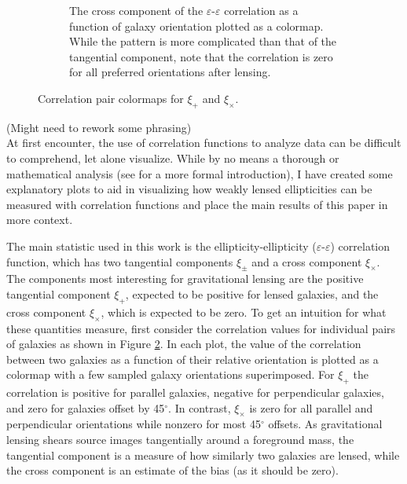\documentclass[%
 reprint,
 amsmath,amssymb,
 aps,nofootinbib
]{revtex4-1}
\begin{document}
\begin{figure}[!b]
\begin{subfigure}{0.425\textwidth}
        \captionsetup{justification=raggedright,singlelinecheck=false}
        \caption{The cross component of the $\varepsilon$-$\varepsilon$ correlation as a function of galaxy orientation plotted as a colormap. While the pattern is more complicated than that of the tangential component, note that the correlation is zero for all preferred orientations after lensing.}
        \label{xix_colormap}
    \end{subfigure}
    \caption{Correlation pair colormaps for $\xi_+$ and $\xi_\times$.}
    \label{corr_colormaps}
\end{figure}

(Might need to rework some phrasing)\\

At first encounter, the use of correlation functions to analyze data can be difficult to comprehend, let alone visualize. While by no means a thorough or mathematical analysis (see \cite{correlation_functions} for a more formal introduction), I have created some explanatory plots to aid in visualizing how weakly lensed ellipticities can be measured with correlation functions and place the main results of this paper in more context.

The main statistic used in this work is the ellipticity-ellipticity ($\varepsilon$-$\varepsilon$) correlation function, which has two tangential components $\xi_\pm$ and a cross component $\xi_\times$. The components most interesting for gravitational lensing are the positive tangential component $\xi_+$, expected to be positive for lensed galaxies, and the cross component $\xi_\times$, which is expected to be zero. To get an intuition for what these quantities measure, first consider the correlation values for individual pairs of galaxies as shown in Figure \ref{corr_colormaps}. In each plot, the value of the correlation between two galaxies as a function of their relative orientation is plotted as a colormap with a few sampled galaxy orientations superimposed. For $\xi_+$ the correlation is positive for parallel galaxies, negative for perpendicular galaxies, and zero for galaxies offset by 45$^\circ$. In contrast, $\xi_\times$ is zero for all parallel and perpendicular orientations while nonzero for most 45$^\circ$ offsets. As gravitational lensing shears source images tangentially around a foreground mass, the tangential component is a measure of how similarly two galaxies are lensed, while the cross component is an estimate of the bias (as it should be zero).
\end{document}
